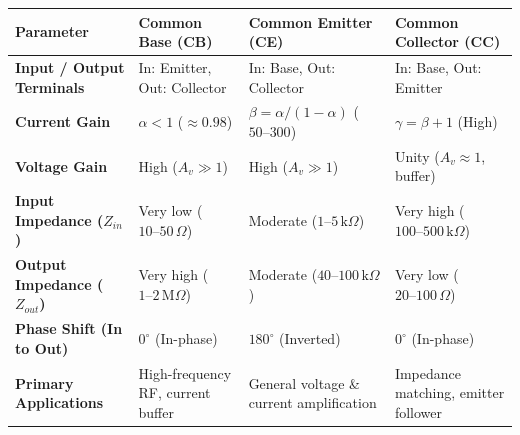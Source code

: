 \documentclass[12pt,a4paper]{article}
\renewcommand{\arraystretch}{1.45}
\begin{document}
\begin{tcolorbox}[tikzbox, title={Comparison of BJT Configurations (CB, CE, CC)}]
\centering
\begingroup
\footnotesize
\setlength{\tabcolsep}{3.5pt}
\setlength{\extrarowheight}{2.5pt}
\renewcommand{\arraystretch}{1.35}
\begin{tabularx}{\linewidth}{|>{\raggedright\arraybackslash\bfseries}m{2.3cm}|Y|Y|Y|}
\hline
\textbf{Parameter} & \textbf{Common Base (CB)} & \textbf{Common Emitter (CE)} & \textbf{Common Collector (CC)} \\
\hline
Input / Output Terminals & In: Emitter, Out: Collector & In: Base, Out: Collector & In: Base, Out: Emitter \\
\hline
Current Gain & $\alpha < 1$ ($\approx 0.98$) & $\beta = \alpha/(1-\alpha)$ ($50\text{--}300$) & $\gamma = \beta + 1$ (High) \\
\hline
Voltage Gain & High ($A_v \gg 1$) & High ($A_v \gg 1$) & Unity ($A_v \approx 1$, buffer) \\
\hline
Input Impedance ($Z_{in}$) & Very low ($10\text{--}50\,\Omega$) & Moderate ($1\text{--}5\,\text{k}\Omega$) & Very high ($100\text{--}500\,\text{k}\Omega$) \\
\hline
Output Impedance ($Z_{out}$) & Very high ($1\text{--}2\,\text{M}\Omega$) & Moderate ($40\text{--}100\,\text{k}\Omega$) & Very low ($20\text{--}100\,\Omega$) \\
\hline
Phase Shift (In to Out) & $0^\circ$ (In-phase) & $180^\circ$ (Inverted) & $0^\circ$ (In-phase) \\
\hline
Primary Applications & High-frequency RF, current buffer & General voltage \& current amplification & Impedance matching, emitter follower \\
\hline
\end{tabularx}
\endgroup
\end{tcolorbox}
\end{document}
